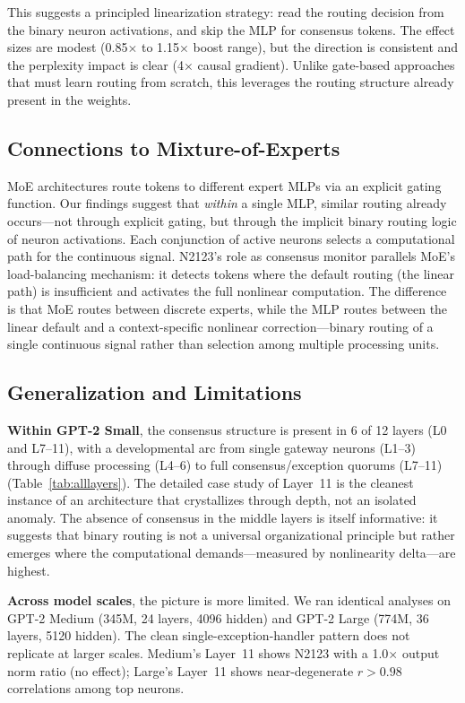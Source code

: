 \documentclass{article}
\begin{document}
This suggests a principled linearization strategy: read the routing decision from the binary
neuron activations, and skip the MLP for consensus tokens. The effect sizes are modest
(0.85$\times$ to 1.15$\times$ boost range), but the direction is consistent and the
perplexity impact is clear (4$\times$ causal gradient).
Unlike gate-based approaches that must learn routing from scratch, this leverages the routing
structure already present in the weights.

\subsection{Connections to Mixture-of-Experts}

MoE architectures route tokens to different expert MLPs via an explicit gating function.
Our findings suggest that \emph{within} a single MLP, similar routing already occurs---not
through explicit gating, but through the implicit binary routing logic of neuron activations.
Each conjunction of active neurons selects a computational path for the continuous signal.
N2123's role as consensus monitor parallels MoE's load-balancing mechanism: it detects tokens
where the default routing (the linear path) is insufficient and activates the full nonlinear
computation. The difference is that MoE routes between discrete experts, while the MLP routes
between the linear default and a context-specific nonlinear correction---binary routing of
a single continuous signal rather than selection among multiple processing units.

\subsection{Generalization and Limitations}
\label{sec:limitations}

\textbf{Within GPT-2 Small}, the consensus structure is present in 6 of 12 layers (L0 and L7--11),
with a developmental arc from single gateway neurons (L1--3) through diffuse processing (L4--6)
to full consensus/exception quorums (L7--11) (Table~\ref{tab:alllayers}). The detailed case study
of Layer~11 is the cleanest instance of an architecture that crystallizes through depth, not an
isolated anomaly. The absence of consensus in the middle layers is itself informative: it suggests
that binary routing is not a universal organizational principle but rather emerges where the
computational demands---measured by nonlinearity delta---are highest.

\textbf{Across model scales}, the picture is more limited. We ran identical analyses on GPT-2
Medium (345M, 24 layers, 4096 hidden) and GPT-2 Large (774M, 36 layers, 5120 hidden). The clean
single-exception-handler pattern does not replicate at larger scales. Medium's Layer~11 shows
N2123 with a 1.0$\times$ output norm ratio (no effect); Large's Layer~11 shows near-degenerate
$r > 0.98$ correlations among top neurons.
\end{document}
